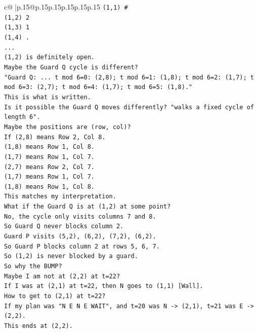 \documentclass{article}
\begin{document}
{\begin{supertabular}{c@{$\;$}|p{.15\linewidth}@{}p{.15\linewidth}p{.15\linewidth}p{.15\linewidth}p{.15\linewidth}p{.15\linewidth}}
{{{\texttt{(1,1) \#} \\
\texttt{(1,2) 2} \\
\texttt{(1,3) 1} \\
\texttt{(1,4) .} \\
\texttt{...} \\
\texttt{(1,2) is definitely open.} \\
\texttt{Maybe the Guard Q cycle is different?} \\
\texttt{"Guard Q: ... t mod 6=0: (2,8); t mod 6=1: (1,8); t mod 6=2: (1,7); t mod 6=3: (2,7); t mod 6=4: (1,7); t mod 6=5: (1,8)."} \\
\texttt{This is what is written.} \\
\texttt{Is it possible the Guard Q moves differently? "walks a fixed cycle of length 6".} \\
\texttt{Maybe the positions are (row, col)?} \\
\texttt{If (2,8) means Row 2, Col 8.} \\
\texttt{(1,8) means Row 1, Col 8.} \\
\texttt{(1,7) means Row 1, Col 7.} \\
\texttt{(2,7) means Row 2, Col 7.} \\
\texttt{(1,7) means Row 1, Col 7.} \\
\texttt{(1,8) means Row 1, Col 8.} \\
\texttt{This matches my interpretation.} \\
\texttt{What if the Guard Q is at (1,2) at some point?} \\
\texttt{No, the cycle only visits columns 7 and 8.} \\
\texttt{So Guard Q never blocks column 2.} \\
\texttt{Guard P visits (5,2), (6,2), (7,2), (6,2).} \\
\texttt{So Guard P blocks column 2 at rows 5, 6, 7.} \\
\texttt{So (1,2) is never blocked by a guard.} \\
\texttt{So why the BUMP?} \\
\texttt{Maybe I am not at (2,2) at t=22?} \\
\texttt{If I was at (2,1) at t=22, then N goes to (1,1) {[}Wall{]}.} \\
\texttt{How to get to (2,1) at t=22?} \\
\texttt{If my plan was "N E N E WAIT", and t=20 was N {-}> (2,1), t=21 was E {-}> (2,2).} \\
\texttt{This ends at (2,2).} \\
}}}
\end{supertabular}}
\end{document}
